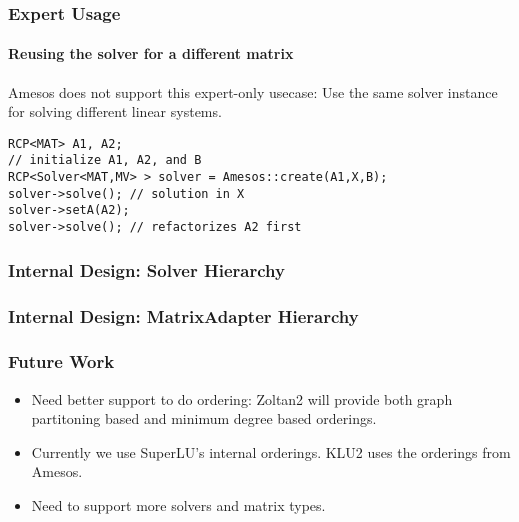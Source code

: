 \documentclass[xcolor=dvipsnames]{beamer}
\begin{document}
\begin{frame}[fragile]
  \frametitle{Expert Usage}
  \framesubtitle{Reusing the solver for a different matrix}
  Amesos does not support this expert-only usecase: Use the same solver instance  for solving different linear systems.
  \begin{lstlisting}
RCP<MAT> A1, A2;
// initialize A1, A2, and B
RCP<Solver<MAT,MV> > solver = Amesos::create(A1,X,B);
solver->solve(); // solution in X
solver->setA(A2);
solver->solve(); // refactorizes A2 first
  \end{lstlisting}
\end{frame}


\begin{frame}
  \frametitle{Internal Design: Solver Hierarchy}
\end{frame}

\begin{frame}
  \frametitle{Internal Design: MatrixAdapter Hierarchy}
\end{frame}

\begin{frame}
  \frametitle{Future Work}
  \begin{itemize}
  \item Need better support to do ordering: Zoltan2 will provide both
    graph partitoning based and minimum degree based orderings.
  \item  Currently we use SuperLU's internal orderings. KLU2 uses the orderings
    from Amesos.
  \item Need to support more solvers and matrix types.
  \end{itemize}
\end{frame}
\end{document}

